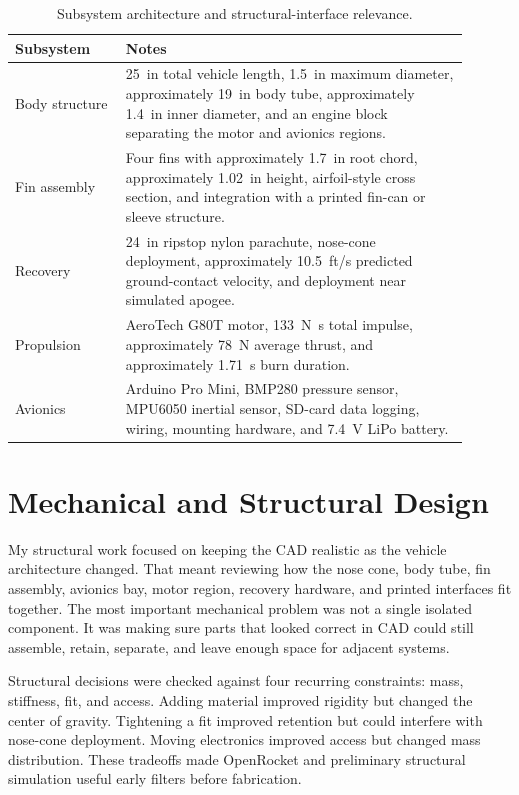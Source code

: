\documentclass[11pt]{article}
\begin{document}
\begin{table}[H]
\centering
\caption{Subsystem architecture and structural-interface relevance.}
\small
\begin{tabular}{p{0.22\linewidth}p{0.68\linewidth}}
\toprule
Subsystem & Notes \\
\midrule
Body structure & \SI{25}{in} total vehicle length, \SI{1.5}{in} maximum diameter, approximately \SI{19}{in} body tube, approximately \SI{1.4}{in} inner diameter, and an engine block separating the motor and avionics regions. \\
Fin assembly & Four fins with approximately \SI{1.7}{in} root chord, approximately \SI{1.02}{in} height, airfoil-style cross section, and integration with a printed fin-can or sleeve structure. \\
Recovery & \SI{24}{in} ripstop nylon parachute, nose-cone deployment, approximately \SI{10.5}{ft/s} predicted ground-contact velocity, and deployment near simulated apogee. \\
Propulsion & AeroTech G80T motor, \SI{133}{N.s} total impulse, approximately \SI{78}{N} average thrust, and approximately \SI{1.71}{s} burn duration. \\
Avionics & Arduino Pro Mini, BMP280 pressure sensor, MPU6050 inertial sensor, SD-card data logging, wiring, mounting hardware, and \SI{7.4}{V} LiPo battery. \\
\bottomrule
\end{tabular}
\end{table}

\section{Mechanical and Structural Design}
My structural work focused on keeping the CAD realistic as the vehicle architecture changed. That meant reviewing how the nose cone, body tube, fin assembly, avionics bay, motor region, recovery hardware, and printed interfaces fit together. The most important mechanical problem was not a single isolated component. It was making sure parts that looked correct in CAD could still assemble, retain, separate, and leave enough space for adjacent systems.

Structural decisions were checked against four recurring constraints: mass, stiffness, fit, and access. Adding material improved rigidity but changed the center of gravity. Tightening a fit improved retention but could interfere with nose-cone deployment. Moving electronics improved access but changed mass distribution. These tradeoffs made OpenRocket and preliminary structural simulation useful early filters before fabrication.
\end{document}
